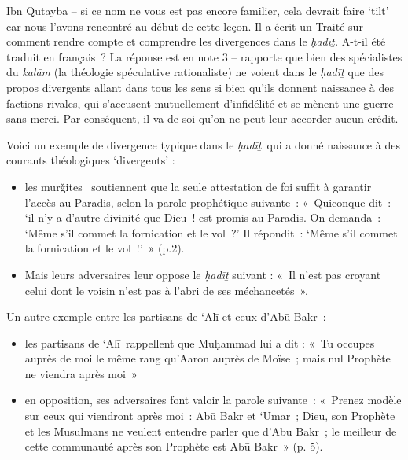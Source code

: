 Ibn Qutayba \label{Theol:IbnQutayba1}-- si ce nom ne vous est pas encore familier, cela devrait
faire `tilt' car nous l'avons rencontré au début de cette leçon. Il a
écrit un Traité sur comment rendre compte et comprendre les divergences
dans le \emph{ḥadīṯ.} A-t-il été traduit en français~? La réponse est en
note 3 -- rapporte que bien des spécialistes du \emph{kalām} (la
théologie spéculative rationaliste) ne voient dans le \emph{ḥadīṯ} que
des propos divergents allant dans tous les sens si bien qu'ils donnent
naissance à des factions rivales, qui s'accusent mutuellement
d'infidélité et se mènent une guerre sans merci. Par conséquent, il va
de soi qu'on ne peut leur accorder aucun crédit.

Voici un exemple de divergence typique dans le \emph{ḥadīṯ}~qui a donné
naissance à des courants théologiques `divergents' :

\begin{itemize}
\item
  les murǧites~ soutiennent que la seule attestation de foi suffit à
  garantir l'accès au Paradis, selon la parole prophétique suivante~:
  «~Quiconque dit~: `il n'y a d'autre divinité que Dieu~! est promis au
  Paradis. On demanda~: `Même s'il commet la fornication et le vol~?' Il
  répondit~: `Même s'il commet la fornication et le vol~!'~»
  (p.2).
\item
  Mais leurs adversaires leur oppose le \emph{ḥadīṯ} suivant : «~Il
  n'est pas croyant celui dont le voisin n'est pas à l'abri de ses
  méchancetés~».
\end{itemize}

Un autre exemple entre les partisans de `Alī et ceux d'Abū Bakr~:

\begin{itemize}
\item
  les partisans de `Alī~rappellent que Muḥammad lui a dit : «~Tu occupes
  auprès de moi le même rang qu'Aaron auprès de Moïse~; mais nul
  Prophète ne viendra après moi~»
\item
  en opposition, ses adversaires font valoir la parole suivante~:
  «~Prenez modèle sur ceux qui viendront après moi~: Abū Bakr et `Umar~;
  Dieu, son Prophète et les Musulmans ne veulent entendre parler que
  d'Abū Bakr~; le meilleur de cette communauté après son Prophète est
  Abū Bakr~» (p. 5).
\end{itemize}


